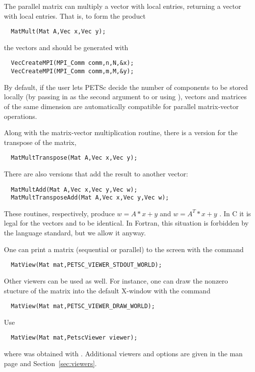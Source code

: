 The parallel matrix can multiply a vector with  
local entries, returning a vector with  local entries. That is, 
to form the product 
\begin{verbatim}
  MatMult(Mat A,Vec x,Vec y);
\end{verbatim}
the vectors  and  should be generated with 
\begin{verbatim}
  VecCreateMPI(MPI_Comm comm,n,N,&x);
  VecCreateMPI(MPI_Comm comm,m,M,&y);
\end{verbatim}
By default, if the user lets PETSc decide the number of components to
be stored locally (by passing in  as the second
argument to  or using ), vectors
and matrices of the same dimension are automatically compatible for
parallel matrix-vector operations.

Along with the matrix-vector multiplication routine, there is 
a version for the transpose of the matrix, 
\begin{verbatim}
  MatMultTranspose(Mat A,Vec x,Vec y);
\end{verbatim}
There are also versions that add the result
to another vector:  
\begin{verbatim}
  MatMultAdd(Mat A,Vec x,Vec y,Vec w);
  MatMultTransposeAdd(Mat A,Vec x,Vec y,Vec w);
\end{verbatim}
These routines, respectively, produce $ w = A*x + y $ and $ w = A^{T}*x + y$ . 
In C it is legal for the vectors  and  to be identical.
In Fortran, this situation is forbidden by the language standard, 
but we allow it anyway.

One can print a matrix (sequential or parallel) to the screen with the 
command 
\begin{verbatim}
  MatView(Mat mat,PETSC_VIEWER_STDOUT_WORLD);
\end{verbatim}
Other viewers can be used as well. For instance, one can draw the
nonzero stucture of the matrix into the default X-window with the 
command 
\begin{verbatim}
  MatView(Mat mat,PETSC_VIEWER_DRAW_WORLD);
\end{verbatim}
Use 
\begin{verbatim}
  MatView(Mat mat,PetscViewer viewer);
\end{verbatim}
where  was obtained with .
Additional viewers  and options are given in the  man
page and Section~\ref{sec:viewers}.

